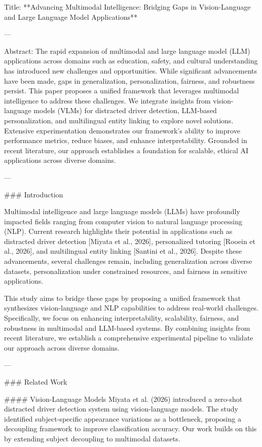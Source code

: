 Title: **Advancing Multimodal Intelligence: Bridging Gaps in Vision-Language and Large Language Model Applications**

---

Abstract:  
The rapid expansion of multimodal and large language model (LLM) applications across domains such as education, safety, and cultural understanding has introduced new challenges and opportunities. While significant advancements have been made, gaps in generalization, personalization, fairness, and robustness persist. This paper proposes a unified framework that leverages multimodal intelligence to address these challenges. We integrate insights from vision-language models (VLMs) for distracted driver detection, LLM-based personalization, and multilingual entity linking to explore novel solutions. Extensive experimentation demonstrates our framework's ability to improve performance metrics, reduce biases, and enhance interpretability. Grounded in recent literature, our approach establishes a foundation for scalable, ethical AI applications across diverse domains.

---

### Introduction  

Multimodal intelligence and large language models (LLMs) have profoundly impacted fields ranging from computer vision to natural language processing (NLP). Current research highlights their potential in applications such as distracted driver detection [Miyata et al., 2026], personalized tutoring [Rooein et al., 2026], and multilingual entity linking [Santini et al., 2026]. Despite these advancements, several challenges remain, including generalization across diverse datasets, personalization under constrained resources, and fairness in sensitive applications.  

This study aims to bridge these gaps by proposing a unified framework that synthesizes vision-language and NLP capabilities to address real-world challenges. Specifically, we focus on enhancing interpretability, scalability, fairness, and robustness in multimodal and LLM-based systems. By combining insights from recent literature, we establish a comprehensive experimental pipeline to validate our approach across diverse domains.

---

### Related Work  

#### Vision-Language Models  
Miyata et al. (2026) introduced a zero-shot distracted driver detection system using vision-language models. The study identified subject-specific appearance variations as a bottleneck, proposing a decoupling framework to improve classification accuracy. Our work builds on this by extending subject decoupling to multimodal datasets.

